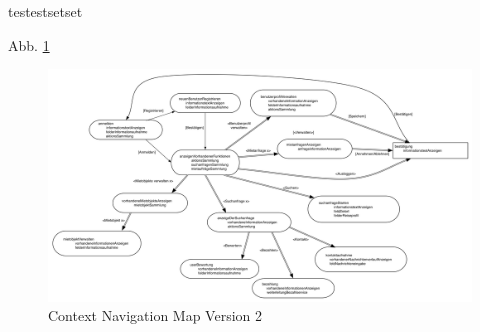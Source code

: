 testestsetset

Abb. \ref{fig:navigationmap2}
\begin{figure}[H]
\includegraphics[width=1\textwidth]{./images/navigationmap2.png}
\caption{Context Navigation Map Version 2}
\label{fig:navigationmap2}
\end{figure}


